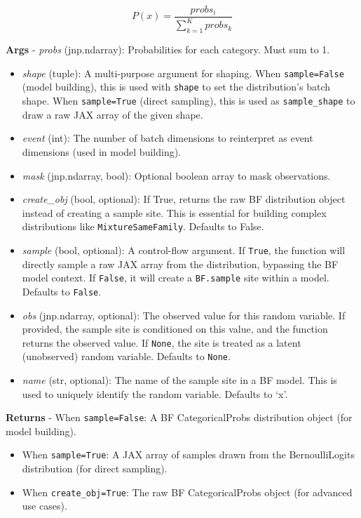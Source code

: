 \documentclass[
  letterpaper,
  DIV=11,
  numbers=noendperiod]{scrartcl}
\begin{document}
\[   
P(x) = \frac{probs_i}{\sum_{k=1}^{K} probs_k}
\]

\textbf{Args} - \emph{probs} (jnp.ndarray): Probabilities for each
category. Must sum to 1.

\begin{itemize}
\item
  \emph{shape} (tuple): A multi-purpose argument for shaping. When
  \texttt{sample=False} (model building), this is used with
  \texttt{shape} to set the distribution's batch shape. When
  \texttt{sample=True} (direct sampling), this is used as
  \texttt{sample\_shape} to draw a raw JAX array of the given shape.
\item
  \emph{event} (int): The number of batch dimensions to reinterpret as
  event dimensions (used in model building).
\item
  \emph{mask} (jnp.ndarray, bool): Optional boolean array to mask
  observations.
\item
  \emph{create\_obj} (bool, optional): If True, returns the raw BF
  distribution object instead of creating a sample site. This is
  essential for building complex distributions like
  \texttt{MixtureSameFamily}. Defaults to False.
\item
  \emph{sample} (bool, optional): A control-flow argument. If
  \texttt{True}, the function will directly sample a raw JAX array from
  the distribution, bypassing the BF model context. If \texttt{False},
  it will create a \texttt{BF.sample} site within a model. Defaults to
  \texttt{False}.
\item
  \emph{obs} (jnp.ndarray, optional): The observed value for this random
  variable. If provided, the sample site is conditioned on this value,
  and the function returns the observed value. If \texttt{None}, the
  site is treated as a latent (unobserved) random variable. Defaults to
  \texttt{None}.
\item
  \emph{name} (str, optional): The name of the sample site in a BF
  model. This is used to uniquely identify the random variable. Defaults
  to `x'.
\end{itemize}

\textbf{Returns} - When \texttt{sample=False}: A BF CategoricalProbs
distribution object (for model building).

\begin{itemize}
\item
  When \texttt{sample=True}: A JAX array of samples drawn from the
  BernoulliLogits distribution (for direct sampling).
\item
  When \texttt{create\_obj=True}: The raw BF CategoricalProbs object
  (for advanced use cases).
\end{itemize}
\end{document}
